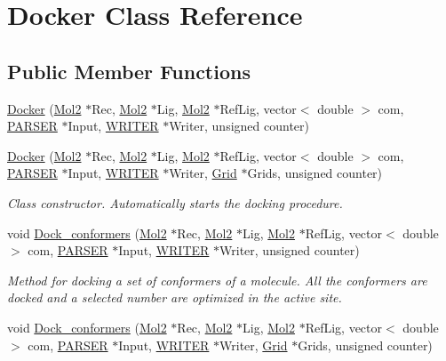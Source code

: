 \hypertarget{classDocker}{
\section{Docker Class Reference}
\label{classDocker}
}
\subsection*{Public Member Functions}
\begin{DoxyCompactItemize}
\item 
\hyperlink{classDocker_a718b8d1bc2646f096b4e51cb8587ee56}{Docker} (\hyperlink{classMol2}{Mol2} $\ast$Rec, \hyperlink{classMol2}{Mol2} $\ast$Lig, \hyperlink{classMol2}{Mol2} $\ast$RefLig, vector$<$ double $>$ com, \hyperlink{classPARSER}{PARSER} $\ast$Input, \hyperlink{classWRITER}{WRITER} $\ast$Writer, unsigned counter)
\item 
\hypertarget{classDocker_a3efdf091dbb892f3b9267e733f9358c0}{
\hyperlink{classDocker_a3efdf091dbb892f3b9267e733f9358c0}{Docker} (\hyperlink{classMol2}{Mol2} $\ast$Rec, \hyperlink{classMol2}{Mol2} $\ast$Lig, \hyperlink{classMol2}{Mol2} $\ast$RefLig, vector$<$ double $>$ com, \hyperlink{classPARSER}{PARSER} $\ast$Input, \hyperlink{classWRITER}{WRITER} $\ast$Writer, \hyperlink{classGrid}{Grid} $\ast$Grids, unsigned counter)}
\label{classDocker_a3efdf091dbb892f3b9267e733f9358c0}

\begin{DoxyCompactList}\small\item\em Class constructor. Automatically starts the docking procedure. \item\end{DoxyCompactList}\item 
\hypertarget{classDocker_a8c6c6543d01963cfc0d4ceaf3e91c9a2}{
void \hyperlink{classDocker_a8c6c6543d01963cfc0d4ceaf3e91c9a2}{Dock\_\-conformers} (\hyperlink{classMol2}{Mol2} $\ast$Rec, \hyperlink{classMol2}{Mol2} $\ast$Lig, \hyperlink{classMol2}{Mol2} $\ast$RefLig, vector$<$ double $>$ com, \hyperlink{classPARSER}{PARSER} $\ast$Input, \hyperlink{classWRITER}{WRITER} $\ast$Writer, unsigned counter)}
\label{classDocker_a8c6c6543d01963cfc0d4ceaf3e91c9a2}

\begin{DoxyCompactList}\small\item\em Method for docking a set of conformers of a molecule. All the conformers are docked and a selected number are optimized in the active site. \item\end{DoxyCompactList}\item 
\hypertarget{classDocker_a61a766a1ebee1fdf9692299c80977478}{
void \hyperlink{classDocker_a61a766a1ebee1fdf9692299c80977478}{Dock\_\-conformers} (\hyperlink{classMol2}{Mol2} $\ast$Rec, \hyperlink{classMol2}{Mol2} $\ast$Lig, \hyperlink{classMol2}{Mol2} $\ast$RefLig, vector$<$ double $>$ com, \hyperlink{classPARSER}{PARSER} $\ast$Input, \hyperlink{classWRITER}{WRITER} $\ast$Writer, \hyperlink{classGrid}{Grid} $\ast$Grids, unsigned counter)}
\label{classDocker_a61a766a1ebee1fdf9692299c80977478}


\end{DoxyCompactItemize}
